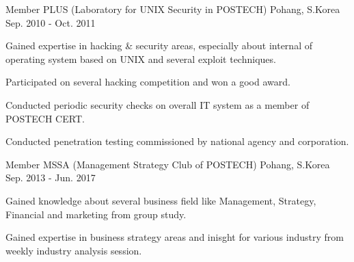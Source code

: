 \begin{cventries}
  \cventry
    {Member} %
    {PLUS (Laboratory for UNIX Security in POSTECH)} %
    {Pohang, S.Korea} %
    {Sep. 2010 - Oct. 2011} %
    {
      \begin{cvitems} %
        \item {Gained expertise in hacking \& security areas, especially about internal of operating system based on UNIX and several exploit techniques.}
        \item {Participated on several hacking competition and won a good award.}
        \item {Conducted periodic security checks on overall IT system as a member of POSTECH CERT.}
        \item {Conducted penetration testing commissioned by national agency and corporation.}
      \end{cvitems}
    }

  \cventry
    {Member} %
    {MSSA (Management Strategy Club of POSTECH)} %
    {Pohang, S.Korea} %
    {Sep. 2013 - Jun. 2017} %
    {
      \begin{cvitems} %
        \item {Gained knowledge about several business field like Management, Strategy, Financial and marketing from group study.}
        \item {Gained expertise in business strategy areas and inisght for various industry from weekly industry analysis session.}
      \end{cvitems}
    }

\end{cventries}
